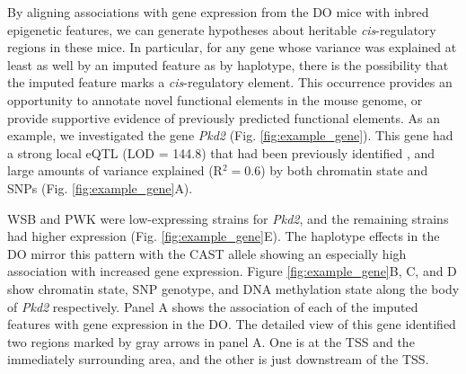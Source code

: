 \documentclass[
  11pt,
]{article}
\begin{document}
By aligning associations with gene expression from the DO mice with
inbred epigenetic features, we can generate hypotheses about heritable
\textit{cis}-regulatory regions in these mice. In particular, for any
gene whose variance was explained at least as well by an imputed feature
as by haplotype, there is the possibility that the imputed feature marks
a \textit{cis}-regulatory element. This occurrence provides an
opportunity to annotate novel functional elements in the mouse genome,
or provide supportive evidence of previously predicted functional
elements. As an example, we investigated the gene \textit{Pkd2} (Fig.
\ref{fig:example_gene}). This gene had a strong local eQTL (LOD = 144.8)
that had been previously identified
\citep{gatti2017effects, pmid27309819}, and large amounts of variance
explained (R\(^2 = 0.6\)) by both chromatin state and SNPs (Fig.
\ref{fig:example_gene}A).

WSB and PWK were low-expressing strains for \textit{Pkd2}, and the
remaining strains had higher expression (Fig. \ref{fig:example_gene}E).
The haplotype effects in the DO mirror this pattern with the CAST allele
showing an especially high association with increased gene expression.
Figure \ref{fig:example_gene}B, C, and D show chromatin state, SNP
genotype, and DNA methylation state along the body of \textit{Pkd2}
respectively. Panel A shows the association of each of the imputed
features with gene expression in the DO. The detailed view of this gene
identified two regions marked by gray arrows in panel A. One is at the
TSS and the immediately surrounding area, and the other is just
downstream of the TSS.
\end{document}
